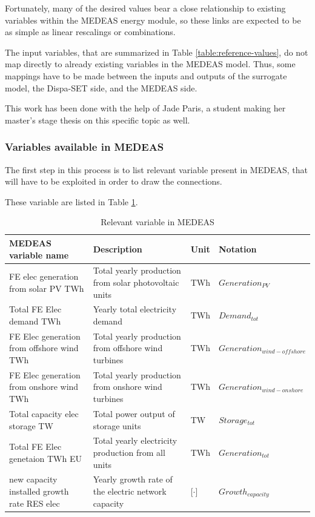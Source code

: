 Fortunately, many of the desired values bear a close relationship to existing variables within the MEDEAS energy module, so these links are expected to be as simple as linear rescalings or combinations.

The input variables, that are summarized in Table \ref{table:reference-values}, do not map directly to already existing variables in the MEDEAS model. Thus, some mappings have to be made between the inputs and outputs of the surrogate model, the Dispa-SET side, and the MEDEAS side.

This work has been done with the help of Jade Paris, a student making her master's stage thesis on this specific topic as well.

\subsubsection{Variables available in MEDEAS}

The first step in this process is to list relevant variable present in MEDEAS, that will have to be exploited in order to draw the connections.

These variable are listed in Table \ref{tab:medeas-vars}.

\begin{table}[h]
    \centering
    \begin{tabular}{|p{5cm}|p{5cm}|p{1cm}|p{4cm}|} \hline 
    MEDEAS variable name &  Description & Unit & Notation \\ \hline
     FE elec generation from solar PV TWh & Total yearly production from solar photovoltaic units & TWh & $Generation_{PV}$\\ \hline 
     Total FE Elec demand TWh & Yearly total electricity demand & TWh & $Demand_{tot}$ \\ \hline 
     FE Elec generation from offshore wind TWh & Total yearly production from offshore wind turbines & TWh & $Generation_{wind-offshore}$ \\ \hline 
     FE Elec generation from onshore wind TWh & Total yearly production from onshore wind turbines & TWh & $Generation_{wind-onshore}$ \\ \hline 
     Total capacity elec storage TW & Total power output of storage units & TW & $Storage_{tot}$ \\ \hline 
     Total FE Elec genetaion TWh EU & Total yearly electricity production from all units & TWh & $Generation_{tot}$ \\ \hline 
     new capacity installed growth rate RES elec & Yearly growth rate of the electric network capacity & [$\cdot$] & $Growth_{capacity}$ \\ \hline
    \end{tabular}
    \caption{Relevant variable in MEDEAS}
    \label{tab:medeas-vars}
\end{table}

